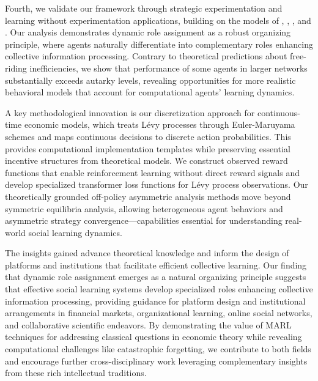 Fourth, we validate our framework through strategic experimentation and learning without experimentation applications, building on the models of \citet{bolton1999strategic}, \citet{keller2020undiscounted}, \citet{huang2024learning}, and \citet{brandl2024}. Our analysis demonstrates dynamic role assignment as a robust organizing principle, where agents naturally differentiate into complementary roles enhancing collective information processing. Contrary to theoretical predictions about free-riding inefficiencies, we show that performance of some agents in larger networks substantially exceeds autarky levels, revealing opportunities for more realistic behavioral models that account for computational agents' learning dynamics.

A key methodological innovation is our discretization approach for continuous-time economic models, which treats Lévy processes through Euler-Maruyama schemes and maps continuous decisions to discrete action probabilities. This provides computational implementation templates while preserving essential incentive structures from theoretical models. We construct observed reward functions that enable reinforcement learning without direct reward signals and develop specialized transformer loss functions for Lévy process observations. Our theoretically grounded off-policy asymmetric analysis methods move beyond symmetric equilibria analysis, allowing heterogeneous agent behaviors and asymmetric strategy convergence—capabilities essential for understanding real-world social learning dynamics.

The insights gained advance theoretical knowledge and inform the design of platforms and institutions that facilitate efficient collective learning. Our finding that dynamic role assignment emerges as a natural organizing principle suggests that effective social learning systems develop specialized roles enhancing collective information processing, providing guidance for platform design and institutional arrangements in financial markets, organizational learning, online social networks, and collaborative scientific endeavors. By demonstrating the value of MARL techniques for addressing classical questions in economic theory while revealing computational challenges like catastrophic forgetting, we contribute to both fields and encourage further cross-disciplinary work leveraging complementary insights from these rich intellectual traditions.

